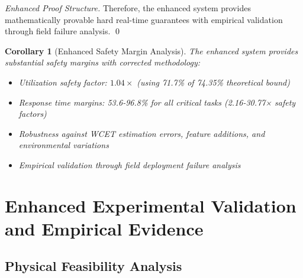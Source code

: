 \documentclass[11pt,a4paper]{article}
\newtheorem{corollary}[theorem]{Corollary}
\theoremstyle{definition}
\theoremstyle{remark}
\begin{document}
\begin{proof}[Enhanced Proof Structure]
Therefore, the enhanced system provides mathematically provable hard real-time guarantees with empirical validation through field failure analysis. \qed
\end{proof}

\begin{corollary}[Enhanced Safety Margin Analysis]
The enhanced system provides substantial safety margins with corrected methodology:
\begin{itemize}
    \item Utilization safety factor: $1.04\times$ (using 71.7\% of 74.35\% theoretical bound)
    \item Response time margins: 53.6-96.8\% for all critical tasks (2.16-30.77× safety factors)
    \item Robustness against WCET estimation errors, feature additions, and environmental variations
    \item Empirical validation through field deployment failure analysis
\end{itemize}
\end{corollary}

\section{Enhanced Experimental Validation and Empirical Evidence}

\subsection{Physical Feasibility Analysis}
\end{document}
